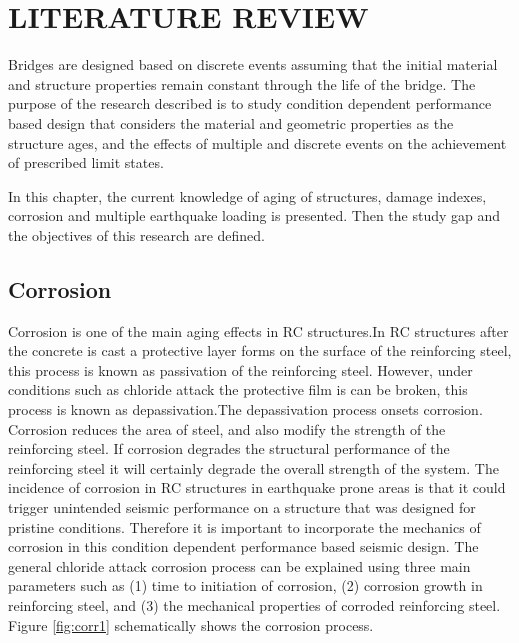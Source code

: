 \chapter{LITERATURE REVIEW}
\label{chap-two}
Bridges are designed based on discrete events assuming that the initial material and structure properties remain constant through the life of the bridge. The purpose of the research described is to study condition dependent performance based design that considers the material and geometric properties as the structure ages, and the effects of multiple and discrete events on the achievement of prescribed limit states.

In this chapter, the current knowledge of aging of structures, damage indexes, corrosion and multiple earthquake loading is presented. Then the study gap and the objectives of this research are defined.

\section{Corrosion}

Corrosion is one of the main aging effects in RC structures.In RC structures after the concrete is cast a protective layer forms on the surface of the reinforcing steel, this process is known as passivation of the reinforcing steel. However, under conditions such as chloride attack the protective film is can be broken, this process is known as depassivation.The depassivation process onsets corrosion. Corrosion reduces the area of steel, and also modify the strength of the reinforcing steel. If corrosion degrades the structural performance of the reinforcing steel it will certainly degrade the overall strength of the system. The incidence of corrosion in RC structures in earthquake prone areas is that it could trigger unintended seismic performance on a structure that was designed for pristine conditions. Therefore it is important to incorporate the  mechanics of corrosion in this condition dependent performance based seismic design. The general chloride attack corrosion process can be explained using three main parameters such as (1) time to initiation of corrosion, (2) corrosion growth in reinforcing steel, and (3) the mechanical properties of corroded reinforcing steel. Figure \ref{fig:corr1} schematically shows the corrosion process.

